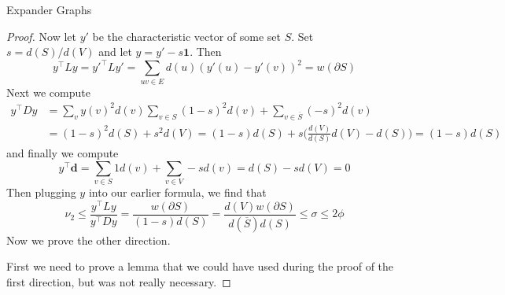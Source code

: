 \documentclass{article}
\begin{document}
\begin{section}{Expander Graphs}
\begin{proof}
     Now let $y'$ be the characteristic vector of some set $S$.
     Set $s = d(S)/d(V)$ and let $y = y' - s \mathbf 1$.
     Then
     $$
     y^\intercal L y = y'^\intercal L y' = \sum_{uv \in E}d(u)(y'(u) - y'(v))^2 = w(\partial S)
     $$
     Next we compute
     \begin{equation}
       \begin{aligned}
	 y^\intercal D y &= \sum_v y(v)^2d(v) \sum_{v \in S}(1-s)^2d(v) + \sum_{v \in \overline S}(-s)^2d(v)\\
	 ~&= (1-s)^2d(S) + s^2d(V) = (1-s)d(S) + s\big(\frac{d(V)}{d(S)}d(V) - d(S)\big) = (1-s)d(S)
       \end{aligned}
     \end{equation}
     and finally we compute
     $$
     y^\intercal \mathbf d = \sum_{v \in S}1d(v) + \sum_{v \in V}-sd(v) = d(S) - sd(V) = 0
     $$
     Then plugging $y$ into our earlier formula, we find that
     $$
     \nu_2 \leq \frac{y^\intercal L y}{y^\intercal D y} = \frac{w(\partial S)}{(1-s)d(S)} = \frac{d(V)w(\partial S)}{d(\overline S)d(S)} \leq \sigma \leq 2\phi
     $$
     Now we prove the other direction.

     First we need to prove a lemma that we could have used during the proof of the first direction, but was not really necessary.
     

\end{proof}
\end{section}
\end{document}
